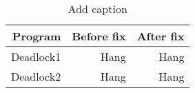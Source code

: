 \begin{table}[htbp]
  \centering
  \caption{Add caption}
    \begin{tabular}{rrr}
    \toprule
    Program & Before fix & After fix \\
    \midrule
    Deadlock1 & Hang & Hang \\
    Deadlock2 & Hang & Hang \\
    \bottomrule
    \end{tabular}%
  \label{tab:addlabel}%
\end{table}%
